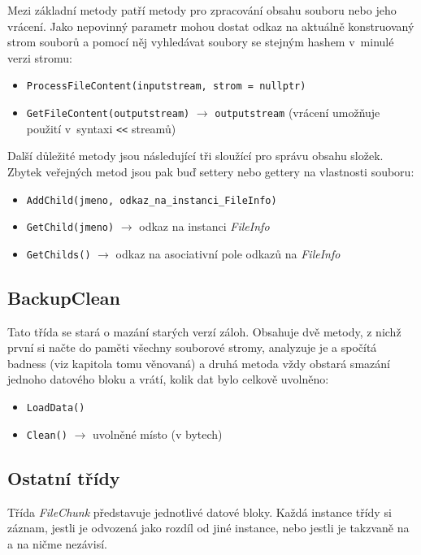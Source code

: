 Mezi základní metody patří metody pro zpracování obsahu souboru nebo jeho
vrácení. Jako nepovinný parametr mohou dostat odkaz na aktuálně konstruovaný
strom souborů a pomocí něj vyhledávat soubory se stejným hashem v~minulé verzi
stromu:

\begin{itemize}
	\item\texttt{ProcessFileContent(inputstream, strom = nullptr)}
	\item\texttt{GetFileContent(outputstream)} $\rightarrow$
	\texttt{outputstream} (vrácení umožňuje použití v~syntaxi \texttt{<\relax<} streamů)
\end{itemize}

Další důležité metody jsou následující tři sloužící pro správu obsahu složek.
Zbytek veřejných metod jsou pak buď settery nebo gettery na vlastnosti souboru:

\begin{itemize}
	\item\texttt{AddChild(jmeno, odkaz\_na\_instanci\_FileInfo)}
	\item\texttt{GetChild(jmeno)} $\rightarrow$ odkaz na instanci {\it FileInfo}
	\item\texttt{GetChilds()} $\rightarrow$ odkaz na asociativní pole odkazů
	na {\it FileInfo}
\end{itemize}

\subsection{BackupClean}

Tato třída se stará o mazání starých verzí záloh. Obsahuje dvě metody, z nichž
první si načte do paměti všechny souborové stromy, analyzuje je a spočítá
badness (viz kapitola tomu věnovaná) a druhá metoda vždy obstará smazání jednoho
datového bloku a vrátí, kolik dat bylo celkově uvolněno:
\begin{itemize}
	\item\texttt{LoadData()}
	\item\texttt{Clean()} $\rightarrow$ uvolněné místo (v bytech)
\end{itemize}

\subsection{Ostatní třídy}

Třída {\it FileChunk} představuje jednotlivé datové bloky. Každá instance třídy
si záznam, jestli je odvozená jako rozdíl od jiné instance, nebo jestli je
takzvaně na  a na ničme nezávisí.

